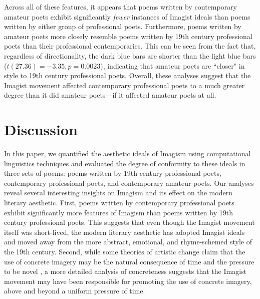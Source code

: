 \documentclass{book}
\begin{document}
Across all of these features, it appears that poems written by contemporary amateur poets exhibit significantly \emph{fewer} instances of Imagist ideals than poems written by either group of professional poets. Furthermore, poems written by amateur poets more closely resemble poems written by 19th century professional poets than their professional contemporaries. This can be seen from the fact that, regardless of directionality, the dark blue bars are shorter than the light blue bars ($t(27.36) = -3.35, p = 0.0023$), indicating that amateur poets are ``closer" in style to 19th century professional poets. Overall, these analyses suggest that the Imagist movement affected contemporary professional poets to a much greater degree than it did amateur poets---if it affected amateur poets at all.




\section{Discussion}
In this paper, we quantified the aesthetic ideals of Imagism using computational linguistics techniques and evaluated the degree of conformity to these ideals in three sets of poems: poems written by 19th century professional poets, contemporary professional poets, and contemporary amateur poets. Our analyses reveal several interesting insights on Imagism and its effect on the modern literary aesthetic. First, poems written by contemporary professional poets exhibit significantly more features of Imagism than poems written by 19th century professional poets. This suggests that even though the Imagist movement itself was short-lived, the modern literary aesthetic has adopted Imagist ideals and moved away from the more abstract, emotional, and rhyme-schemed style of the 19th century. Second, while some theories of artistic change claim that the use of concrete imagery may be the natural consequence of time and the pressure to be novel \citep{martindale1990clockwork}, a more detailed analysis of concreteness suggests that the Imagist movement may have been responsible for promoting the use of concrete imagery, above and beyond a uniform pressure of time. 
\end{document}
